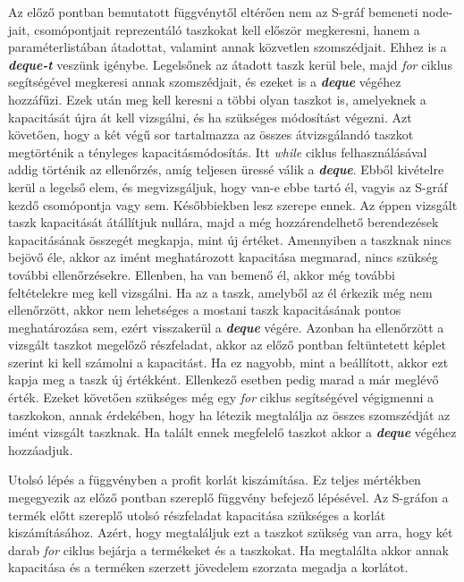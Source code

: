 Az előző pontban bemutatott függvénytől eltérően nem az S-gráf bemeneti node-jait, csomópontjait reprezentáló taszkokat kell először megkeresni, hanem a paraméterlistában átadottat, valamint annak közvetlen szomszédjait. Ehhez is a \textbf{\textit{deque-t}} veszünk igénybe. Legelsőnek az átadott taszk kerül bele, majd \textit{for} ciklus segítségével megkeresi annak szomszédjait, és ezeket is a \textbf{\textit{deque}} végéhez hozzáfűzi. Ezek után meg kell keresni a többi olyan taszkot is, amelyeknek a kapacitását újra át kell vizsgálni, és ha szükséges módosítást végezni. Azt követően, hogy a két végű sor tartalmazza az összes átvizsgálandó taszkot megtörténik a tényleges kapacitásmódosítás. Itt \textit{while} ciklus felhasználásával addig történik az ellenőrzés, amíg teljesen üressé válik a \textbf{\textit{deque}}. Ebből kivételre kerül a legelső elem, és megvizsgáljuk, hogy van-e ebbe tartó él, vagyis az S-gráf kezdő csomópontja vagy sem. Későbbiekben lesz szerepe ennek. Az éppen vizsgált taszk kapacitását átállítjuk nullára, majd a még hozzárendelhető berendezések kapacitásának összegét megkapja, mint új értéket. Amennyiben a taszknak nincs bejövő éle, akkor az imént meghatározott kapacitása megmarad, nincs szükség további ellenőrzésekre. Ellenben, ha van bemenő él, akkor még további feltételekre meg kell vizsgálni. Ha az a taszk, amelyből az él érkezik még nem ellenőrzött, akkor nem lehetséges a mostani taszk kapacitásának pontos meghatározása sem, ezért visszakerül a \textbf{\textit{deque}} végére. Azonban ha ellenőrzött a vizsgált taszkot megelőző részfeladat, akkor az előző pontban feltüntetett képlet szerint ki kell számolni a kapacitást. Ha ez nagyobb, mint a beállított, akkor ezt kapja meg a taszk új értékként. Ellenkező esetben pedig marad a már meglévő érték. Ezeket követően szükséges még egy \textit{for} ciklus segítségével végigmenni a taszkokon, annak érdekében, hogy ha létezik megtalálja az összes szomszédját az imént vizsgált taszknak. Ha talált ennek megfelelő taszkot akkor a \textbf{\textit{deque}} végéhez hozzáadjuk.

Utolsó lépés a függvényben a profit korlát kiszámítása. Ez teljes mértékben megegyezik az előző pontban szereplő függvény befejező lépésével. Az S-gráfon a termék előtt szereplő utolsó részfeladat kapacitása szükséges a korlát kiszámításához. Azért, hogy megtaláljuk ezt a taszkot szükség van arra, hogy két darab \textit{for} ciklus bejárja a termékeket és a taszkokat. Ha megtalálta akkor annak kapacitása és a terméken szerzett jövedelem szorzata megadja a korlátot.

